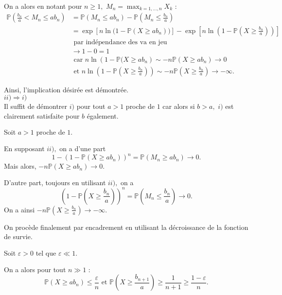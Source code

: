 On a alors en notant pour $n\geq 1,$ $\displaystyle M_{n}=\max_{k=1,\ldots,n}X_{k}$ :
\begin{align*}
\mathbb{P}(\frac{b_{n}}{a}< M_{n} \leq ab_{n}) & = \mathbb{P}(M_{n}\leq ab_{n})-\mathbb{P}(M_{n}\leq \frac{b_{n}}{a})\\
& =\exp\left[ n\ln \big(1-\mathbb{P}(X\geq ab_{n})\big) \right]-\exp\left[ n\ln \left(1-\mathbb{P}(X\geq \frac{b_{n}}{a})\right) \right]\\
& \mbox{ par indépendance des va en jeu}\\
& \longrightarrow 1-0=1\\ 
& \mbox{ car } n\ln\left( 1-\mathbb{P}(X\geq ab_{n}\right)\sim -n\mathbb{P}(X\geq ab_{n})\longrightarrow 0\\
& \mbox{ et } n\ln \left (1-\mathbb{P}(X\geq \frac{b_{n}}{a})\right)\sim -n\mathbb{P}(X\geq \frac{b_{n}}{a})\longrightarrow -\infty.
\end{align*}

Ainsi, l'implication désirée est démontrée.
\\

$\boxed{ii)\Longrightarrow i)}$\\

Il suffit de démontrer $i)$ pour tout $a>1$ proche de $1$ car alors si $b>a,$ $i)$ est clairement satisfaite pour $b$ également.

Soit $a>1$ proche de $1.$ 

En supposant $ii),$ on a d'une part $$1-\left(1-\mathbb{P}(X\geq ab_{n})\right)^{n}=\mathbb{P}(M_{n}\geq ab_{n})\longrightarrow 0.$$
Mais alors, $\displaystyle -n\mathbb{P}(X\geq ab_{n})\longrightarrow 0.$ 


D'autre part, toujours en utilisant $ii),$ on a $$\left(1-\mathbb{P}(X\geq \frac{b_{n}}{a})\right)^{n}=\mathbb{P}(M_{n}\leq \frac{b_{n}}{a})\longrightarrow 0.$$
On a ainsi $\displaystyle -n\mathbb{P}(X\geq \frac{b_{n}}{a})\longrightarrow -\infty.$

On procède finalement par encadrement en utilisant la décroissance de la fonction de survie.

Soit $\varepsilon>0$ tel que $\varepsilon\ll 1.$ 

On a alors pour tout $n\gg 1$ : $$\mathbb{P}(X\geq ab_{n})\leq \frac{\varepsilon}{n} \mbox{ et } \mathbb{P}(X\geq \frac{b_{n+1}}{a})\geq \frac{1}{n+1}\geq \frac{1-\varepsilon}{n}.$$

